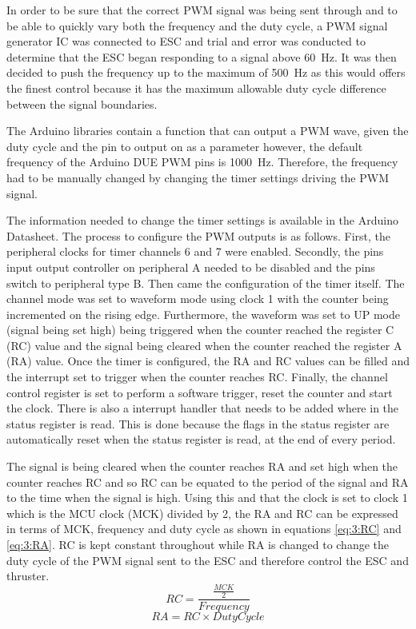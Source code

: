 		\vspace{0.4cm}
		In order to be sure that the correct PWM signal was being sent through and to be able to quickly vary both the frequency and the duty cycle, a PWM signal generator IC was connected to ESC and trial and error was conducted to determine that the ESC began responding to a signal above \SI{60}{\hertz}. It was then decided to push the frequency up to the maximum of \SI{500}{\hertz} as this would offers the finest control because it has the maximum allowable duty cycle difference between the signal boundaries.\par
		\vspace{0.4cm}
		The Arduino libraries contain a function that can output a PWM wave, given the duty cycle and the pin to output on as a parameter however, the default frequency of the Arduino DUE PWM pins is \SI{1000}{\hertz}. Therefore, the frequency had to be manually changed by changing the timer settings driving the PWM signal.\par
		\vspace{0.4cm}
		The information needed to change the timer settings is available in the Arduino Datasheet. The process to configure the PWM outputs is as follows. First, the peripheral clocks for timer channels 6 and 7 were enabled. Secondly, the pins input output controller on peripheral A needed to be disabled and the pins switch to peripheral type B. Then came the configuration of the timer itself. The channel mode was set to waveform mode using clock 1 with the counter being incremented on the rising edge. Furthermore, the waveform was set to UP mode (signal being set high) being triggered when the counter reached the register C (RC) value and the signal being cleared when the counter reached the register A (RA) value. Once the timer is configured, the RA and RC values can be filled and the interrupt set to trigger when the counter reaches RC. Finally, the channel control register is set to perform a software trigger, reset the counter and start the clock. There is also a interrupt handler that needs to be added where in the status register is read. This is done because the flags in the status register are automatically reset when the status register is read, at the end of every period.\par
		\vspace{0.4cm}
		The signal is being cleared when the counter reaches RA and set high when the counter reaches RC and so RC can be equated to the period of the signal and RA to the time when the signal is high. Using this and that the clock is set to clock 1 which is the MCU clock (MCK) divided by 2, the RA and RC can be expressed in terms of MCK, frequency and duty cycle as shown in equations \ref{eq:3:RC} and \ref{eq:3:RA}. RC is kept constant throughout while RA is changed to change the duty cycle of the PWM signal sent to the ESC and therefore control the ESC and thruster.
		\begin{equation}
			RC = \frac{\frac{MCK}{2}}{Frequency}
			\label{eq:3:RC}
		\end{equation}
		\begin{equation}
			RA = RC \times Duty Cycle
			\label{eq:3:RA}
		\end{equation}

